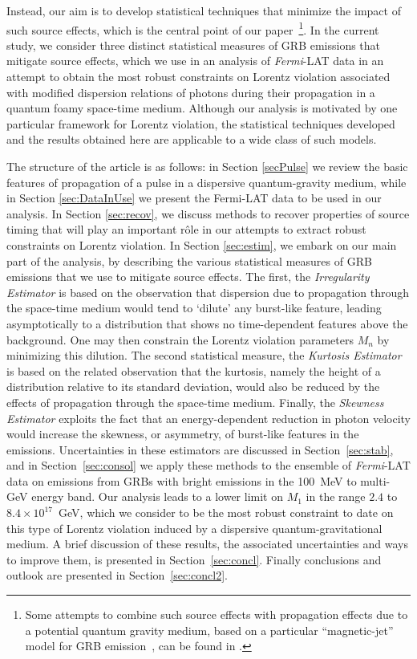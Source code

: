 \documentclass[12pt]{article}
\begin{document}
Instead, our aim is to develop statistical techniques that minimize the impact of such source effects,
which is the central point of our paper~\footnote{Some attempts to combine such source effects with propagation effects due to a
potential quantum gravity medium, based on a particular ``magnetic-jet'' model for GRB emission~\cite{mj}, can be found in \cite{fits}.}.
In the current study, we consider three distinct statistical measures of GRB emissions that mitigate source effects, which we use in an
analysis of {\it Fermi}-LAT data in an attempt to obtain the most robust constraints on Lorentz violation associated with
modified dispersion relations of photons during their propagation in a quantum foamy space-time medium.
Although our analysis is motivated by one particular framework for Lorentz violation, the statistical techniques developed and the
results obtained here are applicable to a wide class of such models.

The structure of the article is as follows: in Section \ref{secPulse} we
review the basic features of propagation of a pulse in a dispersive quantum-gravity medium,
while in Section \ref{sec:DataInUse} we present the Fermi-LAT data to be used in our analysis. In Section
\ref{sec:recov}, we discuss methods to recover properties of source timing that will play an important r\^ole in our attempts to extract
robust constraints on Lorentz violation. In Section \ref{sec:estim},  we embark on our main part of the analysis,
by describing the various statistical measures of GRB emissions that we use to mitigate source effects.
The first, the {\it Irregularity Estimator} is
based on the observation that dispersion due to propagation through the space-time medium would tend
to `dilute' any burst-like feature, leading asymptotically to a distribution that shows no time-dependent features above the background.
One may then constrain the Lorentz violation parameters $M_n$ by minimizing this dilution.
The second statistical measure, the {\it Kurtosis Estimator} is based on the related observation
that the kurtosis, namely the height of a distribution relative to its standard deviation,
would also be reduced by the effects of propagation through the space-time medium.
Finally, the {\it Skewness Estimator} exploits the fact that an energy-dependent reduction in photon velocity
would increase the skewness, or asymmetry, of burst-like features in the emissions.
Uncertainties in these estimators are discussed in Section~\ref{sec:stab}, and in Section~\ref{sec:consol} we apply these methods
to the ensemble of {\it Fermi}-LAT data on emissions from GRBs with
bright emissions in the 100~MeV to multi-GeV energy band. Our analysis
leads to a lower limit on $M_1$ in the range
$2.4$ to $8.4 \times 10^{17}$~GeV,
which we consider to be the most robust  constraint to date on this type of Lorentz violation induced by a dispersive quantum-gravitational medium.
A brief discussion of these results, the associated uncertainties and ways to improve them, is presented in Section~\ref{sec:concl}.
Finally conclusions and outlook are presented in Section~\ref{sec:concl2}.
\end{document}

